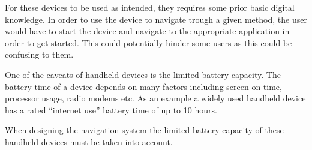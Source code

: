For these devices to be used as intended, they requires some prior basic digital knowledge. In order to use the device to navigate trough a given method, the user would have to start the device and navigate to the appropriate application in order to get started. This could potentially hinder some users as this could be confusing to them.

One of the caveats of handheld devices is the limited battery capacity. The battery time of a device depends on many factors including screen-on time, processor usage, radio modems etc. As an example a widely used handheld device has a rated \enquote{internet use} battery time of up to 10 hours. \cite{Apple}

When designing the navigation system the limited battery capacity of these handheld devices must be taken into account.
